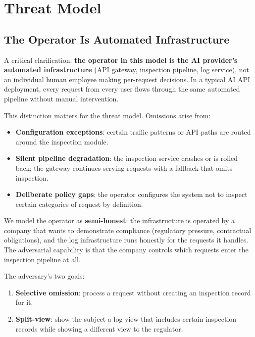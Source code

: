 \documentclass[11pt,a4paper]{article}
\begin{document}
\section{Threat Model}

\subsection{The Operator Is Automated Infrastructure}

A critical clarification: \textbf{the operator in this model is the AI provider's
automated infrastructure} (API gateway, inspection pipeline, log service), not an
individual human employee making per-request decisions. In a typical AI API deployment,
every request from every user flows through the same automated pipeline without manual
intervention.

This distinction matters for the threat model. Omissions arise from:

\begin{itemize}[noitemsep]
  \item \textbf{Configuration exceptions}: certain traffic patterns or API paths are
    routed around the inspection module.
  \item \textbf{Silent pipeline degradation}: the inspection service crashes or is
    rolled back; the gateway continues serving requests with a fallback that omits
    inspection.
  \item \textbf{Deliberate policy gaps}: the operator configures the system not to
    inspect certain categories of request by definition.
\end{itemize}

We model the operator as \textbf{semi-honest}: the infrastructure is operated by a
company that wants to demonstrate compliance (regulatory pressure, contractual
obligations), and the log infrastructure runs honestly for the requests it handles. The
adversarial capability is that the company controls which requests enter the inspection
pipeline at all.

The adversary's two goals:
\begin{enumerate}[noitemsep]
  \item \textbf{Selective omission}: process a request without creating an inspection
    record for it.
  \item \textbf{Split-view}: show the subject a log view that includes certain
    inspection records while showing a different view to the regulator.
\end{enumerate}
\end{document}
